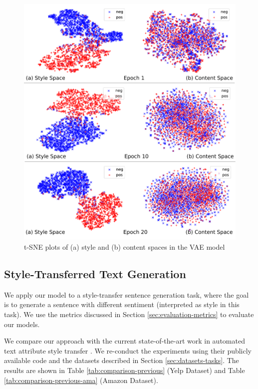 \begin{figure}[ht]
	\includegraphics[width=\linewidth]{images/vae-latent-spaces}
	\caption{t-SNE plots of (a) style and (b) content spaces in the VAE model}
	\label{fig:vae-tsne}
\end{figure}

\subsection{Style-Transferred Text Generation}

We apply our model to a style-transfer sentence generation task, where the goal is to generate a sentence with different sentiment (interpreted as style in this task). We use the metrics discussed in Section \ref{sec:evaluation-metrics} to evaluate our models.

We compare our approach with the current state-of-the-art work in automated text attribute style transfer \citep{shen2017style,fu2017style}. We re-conduct the experiments using their publicly available code and the datasets described in Section \ref{sec:datasets-tasks}. The results are shown in Table \ref{tab:comparison-previous} (Yelp Dataset) and Table \ref{tab:comparison-previous-ama} (Amazon Dataset).

